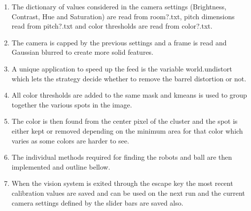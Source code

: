 \documentclass[a4paper,12pt]{article}
\begin{document}
\begin{enumerate}
\item The dictionary of values considered in the camera settings (Brightness, Contrast, Hue and Saturation) are read from room?.txt, pitch dimensions read from pitch?.txt and color thresholds are read from color?.txt.
\item The camera is capped by the previous settings and a frame is read and Gaussian blurred to create more solid features.
\item A unique application to speed up the feed is the variable world.undistort which lets the strategy decide whether to remove the barrel distortion or not.
\item All color thresholds are added to the same mask and kmeans is used to group together the various spots in the image.
\item The color is then found from the center pixel of the cluster and the spot is either kept or removed depending on the minimum area for that color which varies as some colors are harder to see.
\item The individual methods required for finding the robots and ball are then implemented and outline bellow.
\item When the vision system is exited through the escape key the most recent calibration values are saved and can be used on the next run and the current camera settings defined by the slider bars are saved also.
\end{enumerate}
\end{document}
